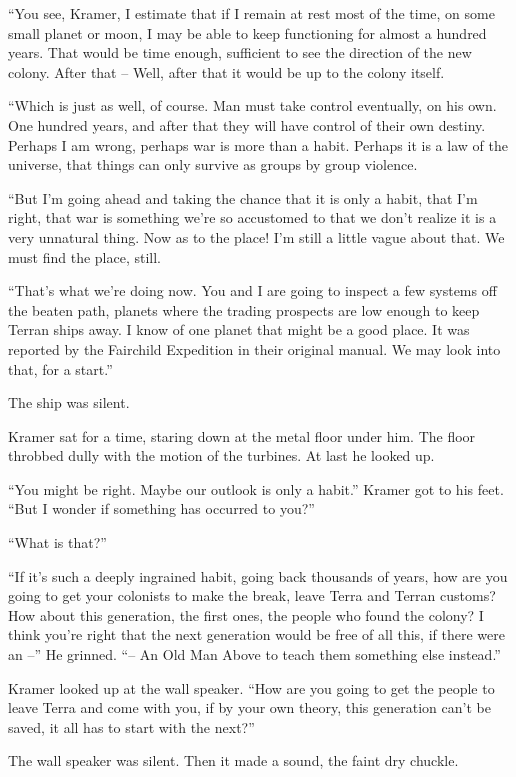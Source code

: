 \documentclass[12pt,a5paper]{book}
\newcommand{\storybreak}{%
  \par\vspace{0.6\baselineskip}
  \begin{center}\color{coveraccent}\small *\enspace *\enspace *\end{center}
  \vspace{0.3\baselineskip}\noindent\ignorespaces
}
\begin{document}
“You see, Kramer, I estimate that if I remain at rest most of the time, on some small planet or moon, I may be able to keep functioning for almost a hundred years. That would be time enough, sufficient to see the direction of the new colony. After that – Well, after that it would be up to the colony itself.

“Which is just as well, of course. Man must take control eventually, on his own. One hundred years, and after that they will have control of their own destiny. Perhaps I am wrong, perhaps war is more than a habit. Perhaps it is a law of the universe, that things can only survive as groups by group violence.

“But I'm going ahead and taking the chance that it is only a habit, that I'm right, that war is something we're so accustomed to that we don't realize it is a very unnatural thing. Now as to the place! I'm still a little vague about that. We must find the place, still.

“That's what we're doing now. You and I are going to inspect a few systems off the beaten path, planets where the trading prospects are low enough to keep Terran ships away. I know of one planet that might be a good place. It was reported by the Fairchild Expedition in their original manual. We may look into that, for a start.”

The ship was silent.

\storybreak
Kramer sat for a time, staring down at the metal floor under him. The floor throbbed dully with the motion of the turbines. At last he looked up.

“You might be right. Maybe our outlook is only a habit.” Kramer got to his feet. “But I wonder if something has occurred to you?”

“What is that?”

“If it's such a deeply ingrained habit, going back thousands of years, how are you going to get your colonists to make the break, leave Terra and Terran customs? How about this generation, the first ones, the people who found the colony? I think you're right that the next generation would be free of all this, if there were an –” He grinned. “– An Old Man Above to teach them something else instead.”

Kramer looked up at the wall speaker. “How are you going to get the people to leave Terra and come with you, if by your own theory, this generation can't be saved, it all has to start with the next?”

The wall speaker was silent. Then it made a sound, the faint dry chuckle.
\end{document}
